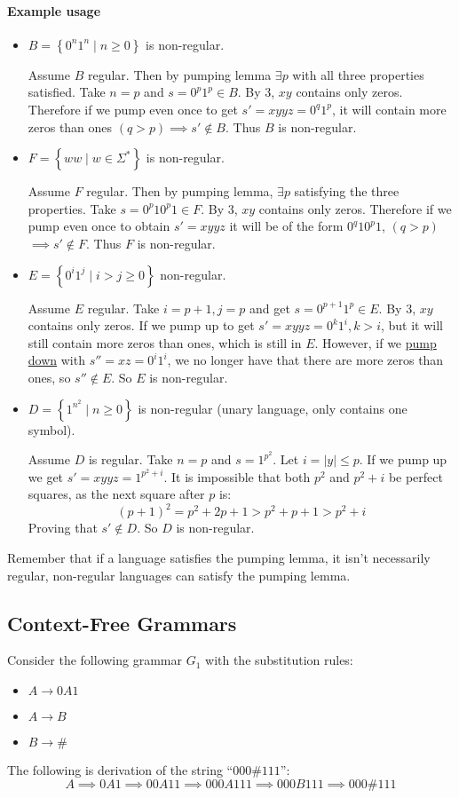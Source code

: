 \documentclass[12 pt]{article}
\begin{document}
\paragraph{Example usage}
\begin{itemize}
\item
$B = \left\{0^n1^n \mid n \geq 0\right\}$ is non-regular.

Assume $B$ regular. Then by pumping lemma $\exists p$ with all three
properties satisfied. Take $n = p$ and $s = 0^p1^p \in B$. By 3, $xy$
contains only zeros. Therefore if we pump even once to get $s' = xyyz
= 0^q1^p$, it will contain more zeros than ones $(q > p) \implies s'
\notin B$. Thus $B$ is non-regular.
\item $F = \left\{ww \mid w \in \Sigma^*\right\}$ is non-regular.

  Assume $F$ regular. Then by pumping lemma, $\exists p$ satisfying
  the three properties. Take $s=0^p10^p1 \in F$. By 3, $xy$ contains
  only zeros. Therefore if we pump even once to obtain $s' = xyyz$ it
  will be of the form $0^q10^p1$, $(q > p)$ $\implies s' \notin F$. Thus $F$
  is non-regular.
\item $E = \left\{0^i1^j \mid i > j \geq 0\right\}$ non-regular.

  Assume $E$ regular. Take $i = p+1, j = p$ and get $s = 0^{p+1}1^p
  \in E$. By 3, $xy$ contains only zeros. If we pump up to get
  $s'=xyyz = 0^k1^i, k > i$, but it will still contain more zeros than
  ones, which is still in $E$. However, if we \underline{pump down} with $s'' = xz
  = 0^i1^i$, we no longer have that there are more zeros than ones, so
  $s'' \notin E$. So $E$ is non-regular.
\item $D = \left\{1^{n^2} \mid n \geq 0\right\}$ is non-regular (unary
  language, only contains one symbol).

  Assume $D$ is regular. Take $n = p$ and $s = 1^{p^2}$. Let $i = |y|
  \leq p$. If we pump up we get $s' = xyyz = 1^{p^2 + i}$. It is
  impossible that both $p^2$ and $p^2 + i$ be perfect squares, as the
  next square after $p$ is:
  $$(p + 1)^2 = p^2 + 2p + 1 > p^2 + p + 1 > p^2 + i$$
  Proving that $s' \notin D$. So $D$ is non-regular.
\end{itemize}
Remember that if a language satisfies the pumping lemma, it isn't
necessarily regular, non-regular languages can satisfy the pumping
lemma.
\subsection{Context-Free Grammars}
Consider the following grammar $G_1$ with the substitution rules:
\begin{itemize}
\item $A \to 0A1$
\item $A \to B$
\item $B \to \#$
\end{itemize}
The following is derivation of the string ``$000\#111$'':
$$A \implies 0A1 \implies 00A11 \implies 000A111 \implies 000B111
\implies 000\# 111$$
\end{document}
